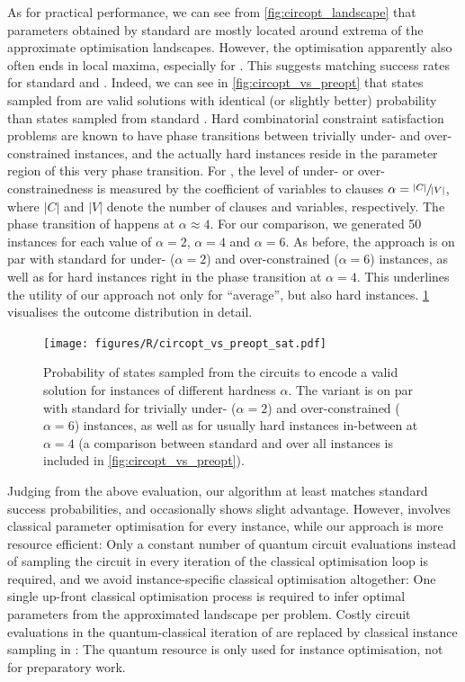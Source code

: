 As for practical performance, we can see from \cref{fig:circopt_landscape} that parameters obtained by standard \QAOA are mostly located around extrema of the approximate optimisation landscapes. However, the optimisation apparently also often ends in local maxima, especially for \qrfactoring. This suggests matching success rates for standard and \ourQAOA. Indeed, we can see in \cref{fig:circopt_vs_preopt} that states sampled from \ourQAOA are valid solutions with identical (or slightly better) probability than states sampled from standard \QAOA. 
Hard combinatorial constraint satisfaction problems are known to have phase transitions between trivially under- and over-constrained instances, and the actually hard instances reside in the parameter region of this very phase transition. For \SAT, the level of under- or over-constrainedness is measured by the coefficient of variables to clauses $\alpha = \sfrac{|C|}{|V|}$, where $|C|$ and $|V|$ denote the number of clauses and variables, respectively. The phase transition of \SAT happens at $\alpha \approx 4$. For our comparison, we generated 50 instances for each value of $\alpha = 2$, $\alpha = 4$ and $\alpha = 6$. As before, the \ourQAOA approach is on par with standard \QAOA for under- ($\alpha = 2$) and over-constrained ($\alpha = 6$) \SAT instances, as well as for hard \SAT instances right in the phase transition at $\alpha = 4$. This underlines the utility of our approach not only for \enquote{average}, but also hard instances. \cref{fig:sat_resolved} visualises the outcome distribution in detail.

\begin{figure}[htbp]
    \texttt{[image: figures/R/circopt\_vs\_preopt\_sat.pdf]}
    \caption{Probability of states sampled from the \QAOA circuits to encode a valid solution for \SAT instances of different hardness $\alpha$. The \ourQAOA variant is on par with standard \QAOA for trivially under- ($\alpha = 2$) and over-constrained ($\alpha = 6$) instances, as well as for usually hard instances in-between at $\alpha = 4$ (a comparison between standard and \ourQAOA over all \SAT instances is included in \cref{fig:circopt_vs_preopt}).}
\label{fig:sat_resolved}
\end{figure}

Judging from the above evaluation, our \ourQAOA algorithm at least 
matches standard \QAOA success probabilities, and 
occasionally shows slight advantage. However, \QAOA involves 
classical parameter optimisation for every instance, while our 
approach is more resource efficient: Only a constant number of 
quantum circuit evaluations instead of sampling the circuit in every 
iteration of the classical optimisation loop is required, and 
we avoid instance-specific classical optimisation altogether:
One single up-front classical optimisation process is required 
to infer optimal parameters from the approximated landscape per 
problem. Costly circuit evaluations in the quantum-classical 
iteration of \QAOA are replaced by classical instance sampling in 
\ourQAOA: The quantum resource is only used for instance 
optimisation, not for preparatory work.


